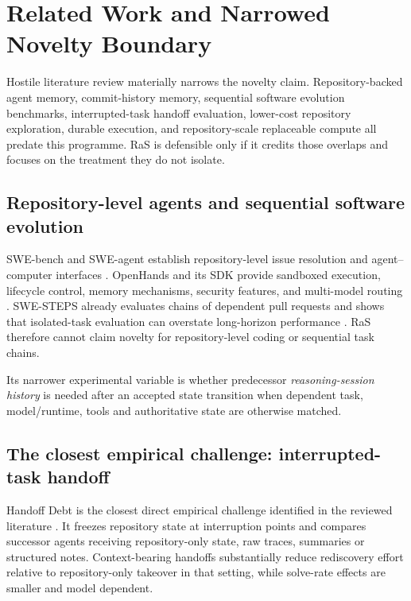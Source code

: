 \section{Related Work and Narrowed Novelty Boundary}
\label{sec:related}

Hostile literature review materially narrows the novelty claim. Repository-backed agent memory, commit-history memory, sequential software evolution benchmarks, interrupted-task handoff evaluation, lower-cost repository exploration, durable execution, and repository-scale replaceable compute all predate this programme. RaS is defensible only if it credits those overlaps and focuses on the treatment they do not isolate.

\subsection{Repository-level agents and sequential software evolution}

SWE-bench and SWE-agent establish repository-level issue resolution and agent--computer interfaces \citep{jimenez2024swebench,yang2024sweagent}. OpenHands and its SDK provide sandboxed execution, lifecycle control, memory mechanisms, security features, and multi-model routing \citep{wang2024openhands,wang2025openhandsSDK}. SWE-STEPS already evaluates chains of dependent pull requests and shows that isolated-task evaluation can overstate long-horizon performance \citep{shastry2026swesteps}. RaS therefore cannot claim novelty for repository-level coding or sequential task chains.

Its narrower experimental variable is whether predecessor \emph{reasoning-session history} is needed after an accepted state transition when dependent task, model/runtime, tools and authoritative state are otherwise matched.

\subsection{The closest empirical challenge: interrupted-task handoff}

Handoff Debt is the closest direct empirical challenge identified in the reviewed literature \citep{kc2026handoff}. It freezes repository state at interruption points and compares successor agents receiving repository-only state, raw traces, summaries or structured notes. Context-bearing handoffs substantially reduce rediscovery effort relative to repository-only takeover in that setting, while solve-rate effects are smaller and model dependent.

